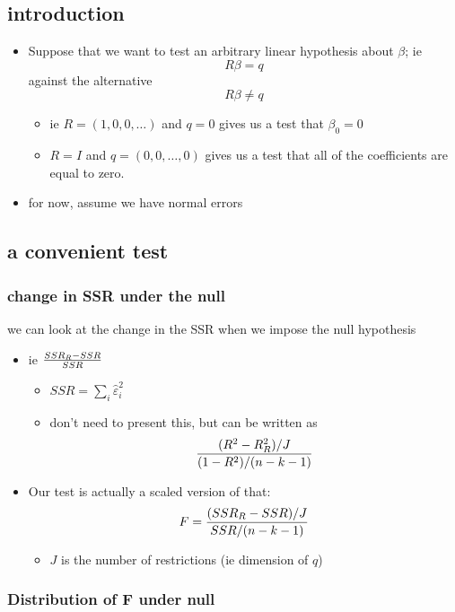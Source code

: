 \documentclass[11pt]{article}
\begin{document}
\subsection{introduction}
\label{sec-2-1}

\begin{itemize}
\item Suppose that we want to test an arbitrary linear hypothesis about
       $\beta$; ie \[R \beta = q\] against the alternative \[R \beta \neq q\]
\begin{itemize}
\item ie $R = (1, 0, 0, \dots)$ and $q = 0$ gives us a test that
         $\beta_0 = 0$
\item $R = I$ and $q = (0,0,\dots,0)$ gives us a test that all of the
         coefficients are equal to zero.
\end{itemize}
\item for now, assume we have normal errors
\end{itemize}
\subsection{a convenient test}
\label{sec-2-2}
\subsubsection{change in SSR under the null}
\label{sec-2-2-1}

      we can look at the change in the SSR when we impose the null
        hypothesis
\begin{itemize}
\item ie ${SSR_R - SSR \over SSR}$
\begin{itemize}
\item $SSR = \sum_i \hat\varepsilon_i^2$
\item don't need to present this, but can be written as \[
            {(R^2 - R^2_R) / J \over (1-R^2) / (n-k-1)} \]
\end{itemize}
\item Our test is actually a scaled version of that:
          \[ F = {(SSR_R - SSR)/J \over SSR / (n-k-1)} \]
\begin{itemize}
\item $J$ is the number of restrictions (ie dimension of $q$)
\end{itemize}
\end{itemize}
\subsubsection{Distribution of F under null}
\label{sec-2-2-2}
\end{document}

